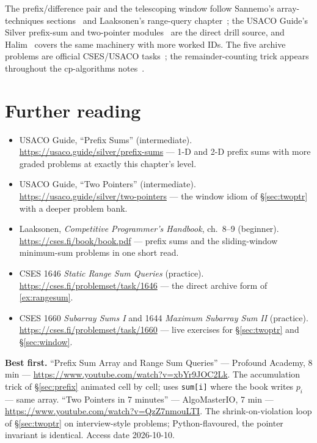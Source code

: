 \chapternotes
The prefix/difference pair and the telescoping window follow
Sannemo's array-techniques sections~\cite{sannemo2025} and
Laaksonen's range-query chapter~\cite{laaksonen2024}; the USACO
Guide's Silver prefix-sum and two-pointer modules~\cite{usacoguide}
are the direct drill source, and Halim~\cite{halimcp4} covers the
same machinery with more worked IDs. The five archive problems are
official CSES/USACO tasks~\cite{cses}; the remainder-counting trick
appears throughout the cp-algorithms notes~\cite{cpalgorithms}.

\section*{Further reading}
\begin{itemize}
\item USACO Guide, ``Prefix Sums'' (intermediate).
\url{https://usaco.guide/silver/prefix-sums} --- 1-D and 2-D prefix sums
with more graded problems at exactly this chapter's level.
\item USACO Guide, ``Two Pointers'' (intermediate).
\url{https://usaco.guide/silver/two-pointers} --- the window idiom of
\S\ref{sec:twoptr} with a deeper problem bank.
\item Laaksonen, \emph{Competitive Programmer's Handbook}, ch.~8--9
(beginner). \url{https://cses.fi/book/book.pdf} --- prefix sums and the
sliding-window minimum-sum problems in one short read.
\item CSES 1646 \emph{Static Range Sum Queries} (practice).
\url{https://cses.fi/problemset/task/1646} --- the direct archive form
of \ref{ex:rangesum}.
\item CSES 1660 \emph{Subarray Sums I} and 1644 \emph{Maximum Subarray
Sum II} (practice). \url{https://cses.fi/problemset/task/1660} ---
live exercises for \S\ref{sec:twoptr} and \S\ref{sec:window}.
\end{itemize}

\begin{rulebox}
\smallskip\noindent\textbf{Best first.}
``Prefix Sum Array and Range Sum Queries'' --- Profound Academy,
8 min --- \url{https://www.youtube.com/watch?v=xbYr9JOC2Lk}. The
accumulation trick of \S\ref{sec:prefix} animated cell by cell;
uses \texttt{sum[i]} where the book writes $p_i$ --- same array.
\smallskip\noindent
``Two Pointers in 7 minutes'' --- AlgoMasterIO, 7 min ---
\url{https://www.youtube.com/watch?v=QzZ7nmouLTI}. The
shrink-on-violation loop of \S\ref{sec:twoptr} on interview-style
problems; Python-flavoured, the pointer invariant is identical.
Access date 2026-10-10.
\end{rulebox}
